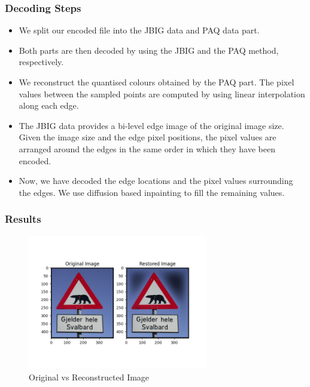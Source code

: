 \documentclass[Serif, 10pt, brown]{beamer}
\theoremstyle{example}
\theoremstyle{plain}
\begin{document}
\begin{frame}
	\frametitle{Decoding Steps}
	\begin{itemize}
		\item We split our encoded file into the JBIG data and PAQ data part. 
		\item Both parts are then decoded by using the JBIG and the PAQ
		method, respectively.
		\item We reconstruct the quantised colours obtained by the PAQ part. The pixel values between the sampled points are computed by using linear interpolation along each edge.
		\item The JBIG data provides a bi-level edge image of the original image size. Given the image size and the edge pixel positions, the pixel values are arranged around the edges in the same order in which they have been encoded.
		\item Now, we have decoded the edge locations and the pixel values surrounding the edges. We use diffusion based inpainting to fill the remaining values.
	\end{itemize}
\end{frame}

\begin{frame}
	\frametitle{Results}
	\begin{figure}
		\centering
		\includegraphics[width=0.7\textwidth]{../results/try_11_0.png}
		\caption{Original vs Reconstructed Image}
	\end{figure}
\end{frame}
\end{document}
